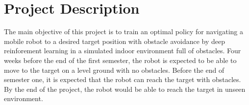 \section{Project Description}

The main objective of this project is to train an optimal policy for navigating a mobile robot to a desired target position with obstacle avoidance by deep reinforement learning in a simulated indoor environment full of obstacles. Four weeks before the end of the first semester, the robot is expected to be able to move to the target on a level ground with no obstacles. Before the end of semester one, it is expected that the robot can reach the target with obstacles. By the end of the project, the robot would be able to reach the target in unseen environment.
